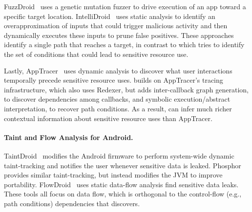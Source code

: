 
FuzzDroid~\cite{rasthofer2017making} uses a genetic mutation fuzzer to
drive execution of an app toward a specific target location.
IntelliDroid~\cite{wong2016intellidroid} uses static analysis to
identify an overapproximation of inputs that could trigger malicious
activity and then dynamically executes these inputs to prune false
positives. These approaches identify a single path that reaches a
target, in contrast to \hogarth{} which tries to identify the set of
conditions that could lead to sensitive resource use.

Lastly, AppTracer~\cite{micinski2017} uses dynamic analysis to
discover what user interactions temporally precede sensitive resource
uses. \hogarth{} builds on AppTracer's tracing infrastructure, which
also uses Redexer, but adds inter-callback graph generation, to
discover dependencies among callbacks, and symbolic execution/abstract
interpretation, to recover path conditions. As a result, \hogarth{}
can infer much richer contextual information about sensitive resource
uses than AppTracer.


\paragraph*{Taint and Flow Analysis for Android.}

TaintDroid~\cite{Enck2010} modifies the Android firmware to perform
system-wide dynamic taint-tracking and notifies the user whenever sensitive
data is leaked.  Phosphor~\cite{Bell2014} provides similar
taint-tracking, but instead modifies the JVM to improve portability.
FlowDroid~\cite{Arzt2014} uses static data-flow analysis find sensitive
data leaks. These tools all focus on data flow, which is orthogonal to
the control-flow (e.g., path conditions) dependencies that \hogarth{}
discovers.

